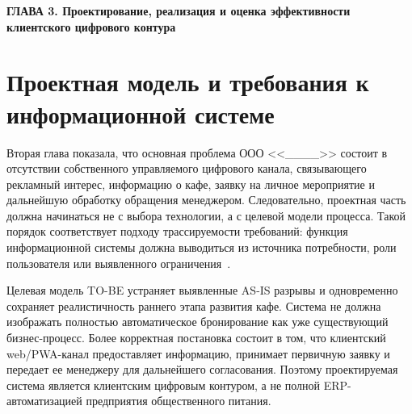 \newpage
\begin{center}
  \textbf{\large ГЛАВА 3. Проектирование, реализация и оценка эффективности клиентского цифрового контура}
\end{center}

\section{Проектная модель и требования к информационной системе}

Вторая глава показала, что основная проблема ООО <<\_\_\_\_>> состоит в отсутствии собственного управляемого цифрового канала, связывающего рекламный интерес, информацию о кафе, заявку на личное мероприятие и дальнейшую обработку обращения менеджером. Следовательно, проектная часть должна начинаться не с выбора технологии, а с целевой модели процесса. Такой порядок соответствует подходу трассируемости требований: функция информационной системы должна выводиться из источника потребности, роли пользователя или выявленного ограничения~\cite{mucha2024}.

Целевая модель TO-BE устраняет выявленные AS-IS разрывы и одновременно сохраняет реалистичность раннего этапа развития кафе. Система не должна изображать полностью автоматическое бронирование как уже существующий бизнес-процесс. Более корректная постановка состоит в том, что клиентский web/PWA-канал предоставляет информацию, принимает первичную заявку и передает ее менеджеру для дальнейшего согласования. Поэтому проектируемая система является клиентским цифровым контуром, а не полной ERP-автоматизацией предприятия общественного питания.

